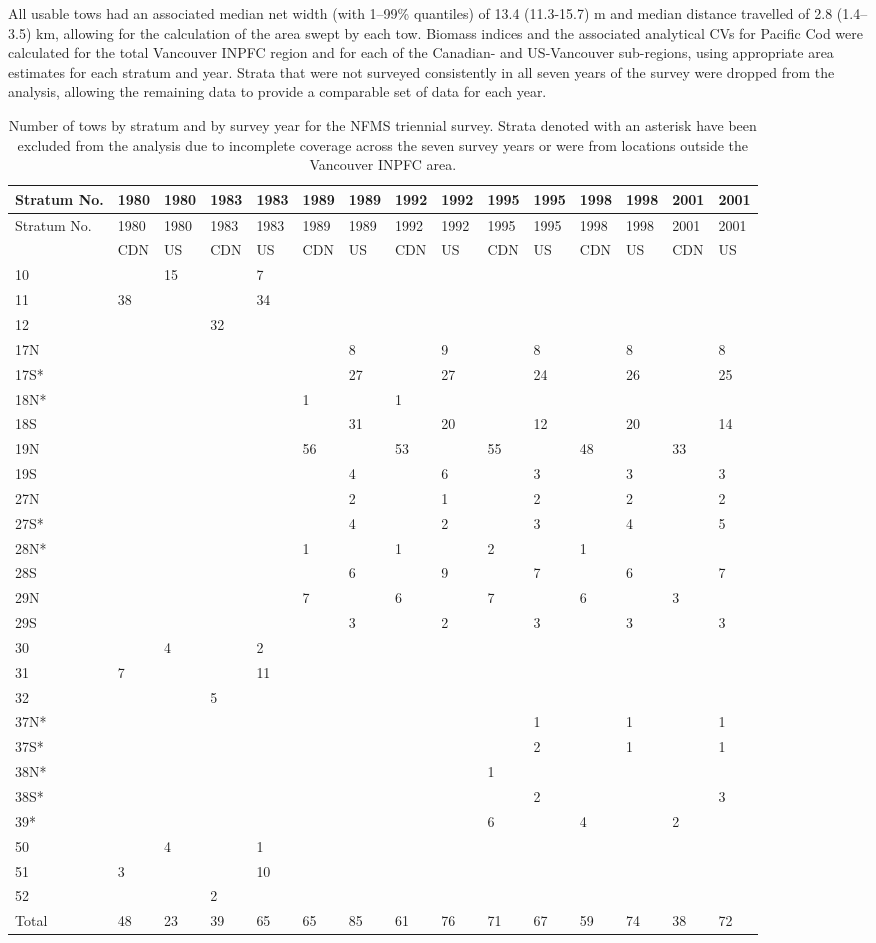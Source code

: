 \documentclass[11pt]{book}
\begin{document}
All usable tows had an associated median net width (with 1--99\% quantiles) of 13.4 (11.3-15.7) m and median distance travelled of 2.8 (1.4--3.5) km, allowing for the calculation of the area swept by each tow. Biomass indices and the associated analytical CVs for Pacific Cod were calculated for the total Vancouver INPFC region and for each of the Canadian- and US-Vancouver sub-regions, using appropriate area estimates for each stratum and year. Strata that were not surveyed consistently in all seven years of the survey were dropped from the analysis, allowing the remaining data to provide a comparable set of data for each year.
\begin{longtable}[]{@{}lllllllllllllll@{}}
\caption{\label{tab:surv-tri-strata-table}Number of tows by stratum and by survey year for the NFMS triennial survey. Strata denoted with an asterisk have been excluded from the analysis due to incomplete coverage across the seven survey years or were from locations outside the Vancouver INPFC area.}\tabularnewline
\toprule
Stratum No. & 1980 & 1980 & 1983 & 1983 & 1989 & 1989 & 1992 & 1992 & 1995 & 1995 & 1998 & 1998 & 2001 & 2001\tabularnewline
\midrule
\endfirsthead
\toprule
Stratum No. & 1980 & 1980 & 1983 & 1983 & 1989 & 1989 & 1992 & 1992 & 1995 & 1995 & 1998 & 1998 & 2001 & 2001\tabularnewline
\midrule
\endhead
& CDN & US & CDN & US & CDN & US & CDN & US & CDN & US & CDN & US & CDN & US\tabularnewline
10 & & 15 & & 7 & & & & & & & & & &\tabularnewline
11 & 38 & & & 34 & & & & & & & & & &\tabularnewline
12 & & & 32 & & & & & & & & & & &\tabularnewline
17N & & & & & & 8 & & 9 & & 8 & & 8 & & 8\tabularnewline
17S* & & & & & & 27 & & 27 & & 24 & & 26 & & 25\tabularnewline
18N* & & & & & 1 & & 1 & & & & & & &\tabularnewline
18S & & & & & & 31 & & 20 & & 12 & & 20 & & 14\tabularnewline
19N & & & & & 56 & & 53 & & 55 & & 48 & & 33 &\tabularnewline
19S & & & & & & 4 & & 6 & & 3 & & 3 & & 3\tabularnewline
27N & & & & & & 2 & & 1 & & 2 & & 2 & & 2\tabularnewline
27S* & & & & & & 4 & & 2 & & 3 & & 4 & & 5\tabularnewline
28N* & & & & & 1 & & 1 & & 2 & & 1 & & &\tabularnewline
28S & & & & & & 6 & & 9 & & 7 & & 6 & & 7\tabularnewline
29N & & & & & 7 & & 6 & & 7 & & 6 & & 3 &\tabularnewline
29S & & & & & & 3 & & 2 & & 3 & & 3 & & 3\tabularnewline
30 & & 4 & & 2 & & & & & & & & & &\tabularnewline
31 & 7 & & & 11 & & & & & & & & & &\tabularnewline
32 & & & 5 & & & & & & & & & & &\tabularnewline
37N* & & & & & & & & & & 1 & & 1 & & 1\tabularnewline
37S* & & & & & & & & & & 2 & & 1 & & 1\tabularnewline
38N* & & & & & & & & & 1 & & & & &\tabularnewline
38S* & & & & & & & & & & 2 & & & & 3\tabularnewline
39* & & & & & & & & & 6 & & 4 & & 2 &\tabularnewline
50 & & 4 & & 1 & & & & & & & & & &\tabularnewline
51 & 3 & & & 10 & & & & & & & & & &\tabularnewline
52 & & & 2 & & & & & & & & & & &\tabularnewline
Total & 48 & 23 & 39 & 65 & 65 & 85 & 61 & 76 & 71 & 67 & 59 & 74 & 38 & 72\tabularnewline
\bottomrule
\end{longtable}
\end{document}
